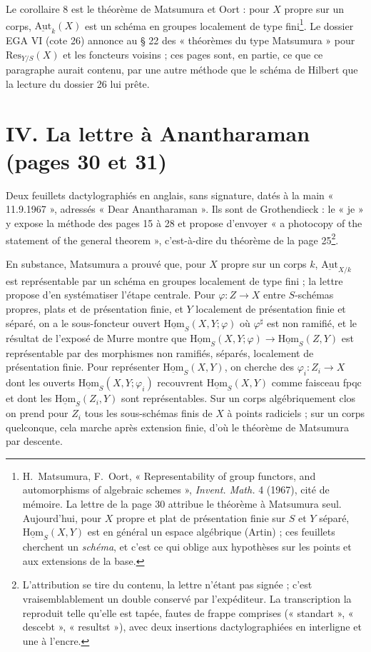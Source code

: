 \documentclass[11pt,a4paper]{article}
\begin{document}
Le corollaire 8 est le théorème de Matsumura et Oort : pour $X$ propre sur un
corps, $\underline{\mathrm{Aut}}_k(X)$ est un schéma en groupes localement de type
fini\footnote{H.~Matsumura, F.~Oort, « Representability of group functors, and
automorphisms of algebraic schemes », \emph{Invent. Math.} 4 (1967), cité de
mémoire. La lettre de la page 30 attribue le théorème à Matsumura seul.
Aujourd'hui, pour $X$ propre et plat de présentation finie sur $S$ et $Y$
séparé, $\underline{\mathrm{Hom}}_S(X,Y)$ est en général un espace algébrique
(Artin) ; ces feuillets cherchent un \emph{schéma}, et c'est
ce qui oblige aux hypothèses sur les points et aux extensions de la base.}.
Le dossier EGA VI (cote 26) annonce au § 22 des « théorèmes du type
Matsumura » pour $\mathrm{Res}_{Y/S}(X)$ et les foncteurs voisins ; ces pages
sont, en partie, ce que ce paragraphe aurait contenu, par une autre méthode
que le schéma de Hilbert que la lecture du dossier 26 lui prête.

\section*{IV. La lettre à Anantharaman (pages 30 et 31)}

Deux feuillets dactylographiés en anglais, sans signature, datés à la main
« 11.9.1967 », adressés « Dear Anantharaman ». Ils sont de Grothendieck : le
« je » y expose la méthode des pages 15 à 28 et propose d'envoyer « a
photocopy of the statement of the general theorem », c'est-à-dire du
théorème de la page 25\footnote{L'attribution se tire du contenu, la lettre
n'étant pas signée ; c'est vraisemblablement un double conservé par
l'expéditeur. La transcription la reproduit telle qu'elle est tapée, fautes
de frappe comprises (« standart », « descebt », « resultst »), avec deux
insertions dactylographiées en interligne et une à l'encre.}.

En substance, Matsumura a prouvé que, pour $X$ propre sur un corps
$k$, $\underline{\mathrm{Aut}}_{X/k}$ est représentable par un schéma en groupes
localement de type fini ; la lettre propose d'en systématiser l'étape centrale.
Pour $\varphi : Z \to X$ entre $S$-schémas propres, plats et de présentation
finie, et $Y$ localement de présentation finie et séparé, on a le
sous-foncteur ouvert $\underline{\mathrm{Hom}}_S(X,Y;\varphi)$ où $\varphi^{\sharp}$
est non ramifié, et le résultat de l'exposé de Murre montre que
$\underline{\mathrm{Hom}}_S(X,Y;\varphi) \to \underline{\mathrm{Hom}}_S(Z,Y)$ est
représentable par des morphismes non ramifiés, séparés, localement de
présentation finie. Pour représenter $\underline{\mathrm{Hom}}_S(X,Y)$, on cherche
des $\varphi_i : Z_i \to X$ dont les ouverts $\underline{\mathrm{Hom}}_S(X,Y;\varphi_i)$
recouvrent $\underline{\mathrm{Hom}}_S(X,Y)$ comme faisceau fpqc et dont les
$\underline{\mathrm{Hom}}_S(Z_i, Y)$ sont représentables. Sur un corps
algébriquement clos on prend pour $Z_i$ tous les sous-schémas finis de $X$ à
points radiciels ; sur un corps quelconque, cela marche après extension finie,
d'où le théorème de Matsumura par descente.
\end{document}
